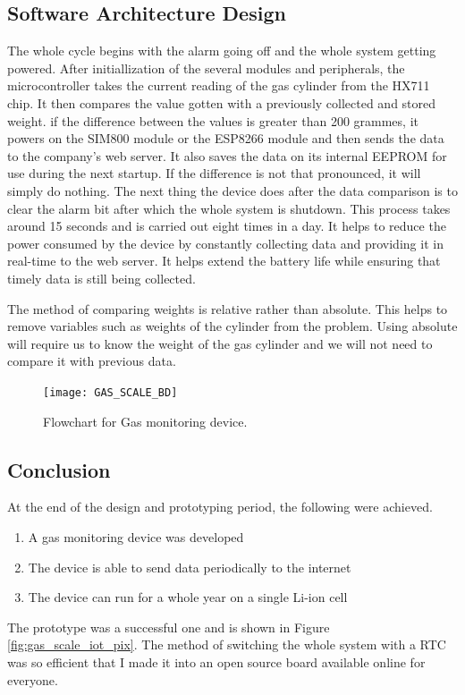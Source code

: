 \subsection{Software Architecture Design}
The whole cycle begins with the alarm going off and the whole system getting powered. After initiallization of the several modules and peripherals, the microcontroller takes the current reading of the gas cylinder from the HX711 chip. It then compares the value gotten with a previously collected and stored weight. if the difference between the values is greater than 200 grammes, it powers on the SIM800 module or the ESP8266 module and then sends the data to the company's web server. It also saves the data on its internal EEPROM for use during the next startup. If the difference is not that pronounced, it will simply do nothing. The next thing the device does after the data comparison is to clear the alarm bit after which the whole system is shutdown. This process takes around 15 seconds and is carried out eight times in a day. It helps to reduce the power consumed by the device by constantly collecting data and providing it in real-time to the web server. It helps extend the battery life while ensuring that timely data is still being collected.

The method of comparing weights is relative rather than absolute. This helps to remove variables such as weights of the cylinder from the problem. Using absolute will require us to know the weight of the gas cylinder and we will not need to compare it with previous data. 

\begin{figure}[p]
\texttt{[image: GAS\_SCALE\_BD]}
\centering
\caption{Flowchart for Gas monitoring device.}
\centering
\label{fig:GAS_SCALE_BD}
\end{figure}



\subsection{Conclusion}
At the end of the design and prototyping period, the following were achieved.
\begin{enumerate}
\item A gas monitoring device was developed
\item The device is able to send data periodically to the internet
\item The device can run for a whole year on a single Li-ion cell
\end{enumerate}
The prototype was a successful one and is shown in Figure \ref{fig:gas_scale_iot_pix}. The method of switching the whole system with a RTC was so efficient that I made it into an open source board available online for everyone. 

